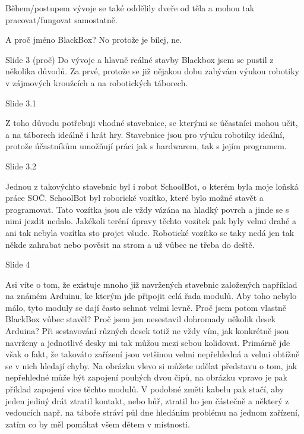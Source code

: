Během/postupem vývoje se také oddělily dveře od těla a mohou tak pracovat/fungovat samostatně.

A proč jméno BlackBox? No protože je bílej, ne. %


Slide 3 (proč)
Do vývoje a hlavně reálné stavby Blackbox jsem se pustil z několika důvodů. Za prvé, protože se již nějakou dobu zabývám 
výukou robotiky v zájmových kroužcích a na robotických táborech. 

    Slide 3.1

    Z toho důvodu potřebuji 
    vhodné stavebnice, se kterými se účastníci mohou učit, a na táborech ideálně i hrát hry.
    Stavebnice jsou pro výuku robotiky ideální, protože účastníkům umožňují práci jak 
    s hardwarem, tak s jejím programem. %

    Slide 3.2

    Jednou z takovýchto stavebnic byl i robot SchoolBot, o kterém byla moje loňská práce SOČ.
    SchoolBot byl roborické vozítko, které bylo možné stavět a programovat.  
    Tato vozítka jsou ale vždy vázána na hladký povrch a jinde se s nimi jezdit nedalo.
    Jakékoli teréní úpravy těchto vozítek pak byly velmi drahé a ani tak nebyla vozítka sto projet všude.
    Robotické vozítko se taky nedá jen tak někde zahrabat nebo pověsit na strom a už vůbec ne třeba do deště. 


Slide 4 

Asi víte o tom, že existuje mnoho již navržených stavebnic založených například na známém Arduinu, 
ke kterým jde připojit celá řada modulů. Aby toho nebylo málo, tyto moduly se dají často sehnat velmi levně. 
Proč jsem potom vlastně BlackBox vůbec stavěl? Proč jsem jen nesestavil dohromady několik desek Arduina? 
Při sestavování různých desek
totiž ne vždy vím, jak konkrétně jsou navrženy a jednotlivé desky mi tak můžou mezi sebou kolidovat.
Primárně jde však o fakt, že takováto zařízení jsou vetšinou velmi nepřehledná a velmi obtížně se v nich hledají chyby. 
Na obrázku vlevo si můžete udělat představu o tom, jak nepřehledné může být zapojení pouhých dvou čipů, 
na obrázku vpravo je pak příklad zapojení vice těchto modulů. V podobné změti kabelu pak stačí, aby jeden jediný drát 
ztratil kontakt, nebo hůř, ztratil ho jen částečně a některý z vedoucích např. na táboře stráví půl dne hledáním problému 
na jednom zařízení, zatím co by měl pomáhat všem dětem v místnosti.


